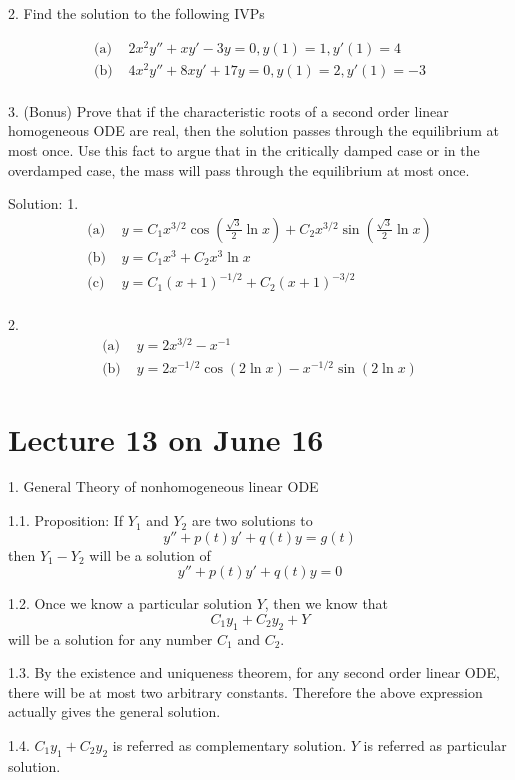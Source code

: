 \documentclass[11pt]{article}
\begin{document}
2. Find the solution to the following IVPs

$$\begin{aligned}
\text{(a)  }&2x^2 y'' + xy' - 3y = 0, y(1) = 1, y'(1) = 4\\
\text{(b)  }&4x^2 y'' + 8xy' + 17y = 0, y(1) = 2, y'(1) = -3\\
\end{aligned}
$$

3. (Bonus) Prove that if the characteristic roots of a second order linear homogeneous ODE are real, then the solution passes through the equilibrium at most once. Use this fact to argue that in the critically damped case or in the overdamped case, the mass will pass through the equilibrium at most once. 

Solution: 
1. 
$$
\begin{aligned}
\text{(a)  }& y = C_1 x^{3/2} \cos (\frac {\sqrt 3}{2}\ln x) + C_2 x^{3/2} \sin (\frac {\sqrt 3}{2}\ln x)\\
\text{(b)  }& y = C_1 x^3 + C_2 x^3 \ln x\\
\text{(c)  }& y = C_1 (x+1)^{-1/2} + C_2 (x+1)^{-3/2}\\
\end{aligned}
$$


2. 
$$
\begin{aligned}
\text{(a)  }&y = 2x^{3/2} - x^{-1}\\
\text{(b)  }&y = 2x^{-1/2}\cos(2\ln x) - x^{-1/2}\sin(2\ln x)
\end{aligned}
$$

\newpage
\section{Lecture 13 on June 16}

1. General Theory of nonhomogeneous linear ODE

1.1. Proposition: If $Y_1$ and $Y_2$ are two solutions to 
$$y'' + p(t) y' + q(t)y = g(t)$$
then $Y_1 - Y_2$ will be a solution of 
$$y'' + p(t) y' + q(t)y = 0$$

1.2. Once we know a particular solution $Y$, then we know that
$$C_1 y_1 + C_2 y_2 + Y$$ will be a solution for any number $C_1$ and $C_2$. 

1.3. By the existence and uniqueness theorem, for any second order linear ODE, there will be at most two arbitrary constants. Therefore the above expression actually gives the general solution.

1.4. $C_1y_1 + C_2 y_2$ is referred as complementary solution. $Y$ is referred as particular solution.\\
\end{document}

